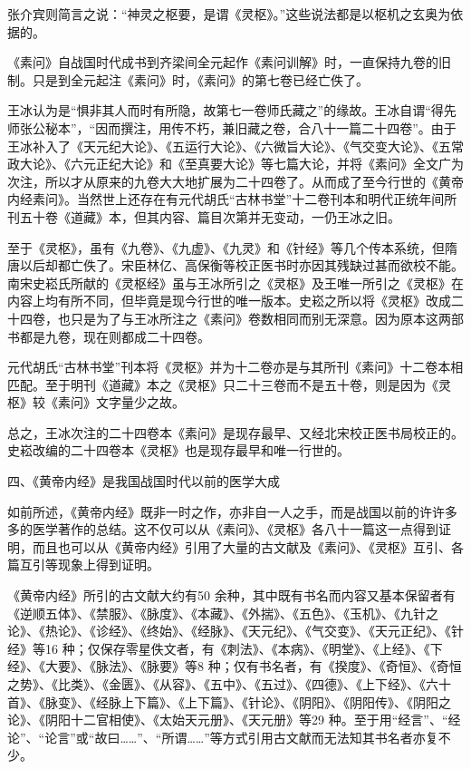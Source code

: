 \documentclass[12pt,UTF8]{ctexbook}
\begin{document}
张介宾则简言之说：“神灵之枢要，是谓《灵枢》。”这些说法都是以枢机之玄奥为依据的。

《素问》自战国时代成书到齐梁间全元起作《素问训解》时，一直保持九卷的旧制。只是到全元起注《素问》时，《素问》的第七卷已经亡佚了。

王冰认为是“惧非其人而时有所隐，故第七一卷师氏藏之”的缘故。王冰自谓“得先师张公秘本”，“因而撰注，用传不朽，兼旧藏之卷，合八十一篇二十四卷”。由于王冰补入了《天元纪大论》、《五运行大论》、《六微旨大论》、《气交变大论》、《五常政大论》、《六元正纪大论》和《至真要大论》等七篇大论，并将《素问》全文广为次注，所以才从原来的九卷大大地扩展为二十四卷了。从而成了至今行世的《黄帝内经素问》。当然世上还存在有元代胡氏“古林书堂”十二卷刊本和明代正统年间所刊五十卷《道藏》本，但其内容、篇目次第并无变动，一仍王冰之旧。

至于《灵枢》，虽有《九卷》、《九虚》、《九灵》和《针经》等几个传本系统，但隋唐以后却都亡佚了。宋臣林亿、高保衡等校正医书时亦因其残缺过甚而欲校不能。南宋史崧氏所献的《灵枢经》虽与王冰所引之《灵枢》及王唯一所引之《灵枢》在内容上均有所不同，但毕竟是现今行世的唯一版本。史崧之所以将《灵枢》改成二十四卷，也只是为了与王冰所注之《素问》卷数相同而别无深意。因为原本这两部书都是九卷，现在则都成二十四卷。

元代胡氏“古林书堂”刊本将《灵枢》并为十二卷亦是与其所刊《素问》十二卷本相匹配。至于明刊《道藏》本之《灵枢》只二十三卷而不是五十卷，则是因为《灵枢》较《素问》文字量少之故。

总之，王冰次注的二十四卷本《素问》是现存最早、又经北宋校正医书局校正的。史崧改编的二十四卷本《灵枢》也是现存最早和唯一行世的。

四、《黄帝内经》是我国战国时代以前的医学大成

如前所述，《黄帝内经》既非一时之作，亦非自一人之手，而是战国以前的许许多多的医学著作的总结。这不仅可以从《素问》、《灵枢》各八十一篇这一点得到证明，而且也可以从《黄帝内经》引用了大量的古文献及《素问》、《灵枢》互引、各篇互引等现象上得到证明。

《黄帝内经》所引的古文献大约有50 余种，其中既有书名而内容又基本保留者有《逆顺五体》、《禁服》、《脉度》、《本藏》、《外揣》、《五色》、《玉机》、《九针之论》、《热论》、《诊经》、《终始》、《经脉》、《天元纪》、《气交变》、《天元正纪》、《针经》等16 种；仅保存零星佚文者，有《刺法》、《本病》、《明堂》、《上经》、《下经》、《大要》、《脉法》、《脉要》等8 种；仅有书名者，有《揆度》、《奇恒》、《奇恒之势》、《比类》、《金匮》、《从容》、《五中》、《五过》、《四德》、《上下经》、《六十首》、《脉变》、《经脉上下篇》、《上下篇》、《针论》、《阴阳》、《阴阳传》、《阴阳之论》、《阴阳十二官相使》、《太始天元册》、《天元册》等29 种。至于用“经言”、“经论”、“论言”或“故曰……”、“所谓……”等方式引用古文献而无法知其书名者亦复不少。
\end{document}
